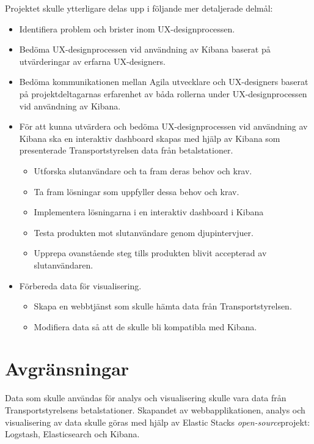 \documentclass[12pt]{kththesis}
\begin{document}
Projektet skulle ytterligare delas upp i följande mer detaljerade delmål:

\begin{itemize}

\item Identifiera problem och brister inom UX-designprocessen. 

\item Bedöma UX-designprocessen vid användning av Kibana baserat på utvärderingar av erfarna UX-designers. 

\item Bedöma kommunikationen mellan Agila utvecklare och UX-designers baserat på projektdeltagarnas erfarenhet av båda rollerna under UX-designprocessen vid användning av Kibana.

\item För att kunna utvärdera och bedöma UX-designprocessen vid användning av Kibana ska en interaktiv dashboard skapas med hjälp av Kibana som presenterade Transportstyrelsen data från betalstationer.

\begin{itemize}
\item Utforska slutanvändare och ta fram deras behov och krav.
\item Ta fram lösningar som uppfyller dessa behov och krav.
\item Implementera lösningarna i en interaktiv dashboard i Kibana 
\item Testa produkten mot slutanvändare genom djupintervjuer. 
\item Upprepa ovanstående steg tills produkten blivit accepterad av slutanvändaren.
\end{itemize}

\item Förbereda data för visualisering.
\begin{itemize}
\item Skapa en webbtjänst som skulle hämta data från Transportstyrelsen.
\item Modifiera data så att de skulle bli kompatibla med Kibana.
\end{itemize}

\end{itemize} 

\section{Avgränsningar}
Data som skulle användas för analys och visualisering skulle vara data från Transportstyrelsens betalstationer. Skapandet av webbapplikationen, analys och visualisering av data skulle göras med hjälp av Elastic Stacks \textit{open-source}projekt: Logstash, Elasticsearch och Kibana.  
\end{document}
